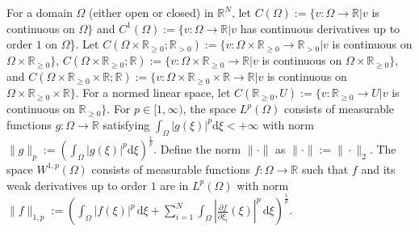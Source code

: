 \documentclass[onecolumn]{autart}
\newenvironment{proof of Prop.ODE}{{\it Proof of Proposition~\ref{Prop.ODE}:\enspace}}{\hfill $\blacksquare$\par}
\newenvironment{proof of PDE}{{\it Proof of Proposition \ref{Prop.8}:\enspace}}{\hfill $\blacksquare$\par}
\begin{document}
{	For a domain $\Omega$  (either open or closed) in $\mathbb{R}^N$, let $C\left({\Omega}\right):=\big\{v: {\Omega} \rightarrow \mathbb{R}\big|  v$ is continuous on $\Omega\big\}$ and
	$C^1\left({\Omega}\right):=\{v: {\Omega} \rightarrow\mathbb{R}\big|  v$ has continuous derivatives up to order $1$ on ${\Omega}$\big\}.
	Let $C(\Omega\times\mathbb{R}_{\geq 0};{\mathbb{R}_{>0}}):=\big\{v : {\Omega\times\mathbb{R}_{\geq 0}} \rightarrow {\mathbb{R}_{>0}}\big|  v$ is continuous on $\Omega\times\mathbb{R}_{\geq 0}\big\}$,  $C(\Omega\times\mathbb{R}_{\geq 0};{\mathbb{R}}):=\big\{v : {\Omega\times\mathbb{R}_{\geq 0}} \rightarrow {\mathbb{R}}\big|  v$ is continuous on $\Omega\times\mathbb{R}_{\geq 0}\big\}$, and $C(\Omega\times\mathbb{R}_{\geq 0}\times\mathbb{R};\mathbb{R}):=\big\{v : {\Omega\times\mathbb{R}_{\geq 0}\times\mathbb{R}} \rightarrow \mathbb{R}\big|  v$ is continuous on $\Omega\times\mathbb{R}_{\geq 0}\times\mathbb{R}\big\}$.
	For  a normed linear space, let $C(\mathbb{R}_{\geq 0},{ U}):=\big\{v: {\mathbb{R}_{\geq 0}} \rightarrow  U\big|  v$ is continuous on $\mathbb{R}_{\geq 0}\big\}$.
	For $p\in[1,\infty)$, the space $L^p(\Omega)$  consists of  measurable functions $g: \Omega\to\mathbb{R}$ satisfying $ \int_\Omega\left|g(\xi)\right|^p\mathrm{ d}\xi <+\infty$ with norm $\|g\|_p:=\left(\int_\Omega\left|g(\xi)\right|^p\mathrm{ d}\xi\right)^{\frac{1}{p}}$. Define the norm $\|\cdot\|$ as $\|\cdot\|:=\|\cdot\|_2$. The space $W^{1,p}(\Omega)$ consists of measurable functions $f: \Omega\to\mathbb{R}$ such that $f$ and its weak derivatives up to order $1$ are in $L^p(\Omega)$ with norm $\|f\|_{1,p} := \left( \int_\Omega \left|f(\xi)\right|^p \, \mathrm{d}\xi + {\sum_{i=1}^N} \int_\Omega \left|\frac{\partial f}{\partial \xi_i}(\xi)\right|^p \, \mathrm{d}\xi \right)^{\frac{1}{p}}$.
	
	
	
}
\end{document}
